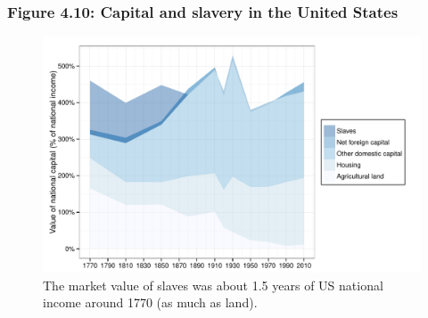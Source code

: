 \documentclass[t]{beamer}\usepackage[]{graphicx}\usepackage[]{color}
\newenvironment{knitrout}{}{} %
\begin{document}
\begin{frame}[label=Figure_4_10]
\frametitle{Figure 4.10: Capital and slavery in the United States}
\begin{figure}[t]
\begin{minipage}[b]{\textwidth}
\centering
\begin{knitrout}\footnotesize
{}\color{fgcolor}

{\centering \includegraphics[width=1\linewidth]{figures/color/Figure_4_10} 

}



\end{knitrout}
\caption{The market value of slaves was about 1.5 years of US national income around 1770 (as much as land).}
\end{minipage}
\end{figure}
\end{frame}
\end{document}
